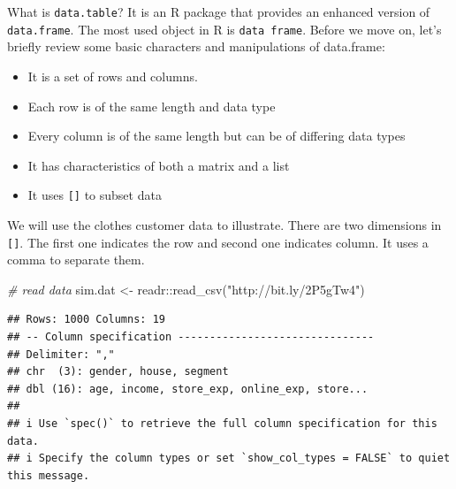 \documentclass[
  12pt,
]{krantz}
\makeatletter
\newenvironment{Shaded}{\begin{snugshade}}{\end{snugshade}}
\newcommand{\CommentTok}[1]{\textcolor[rgb]{0.37,0.37,0.37}{\textit{#1}}}
\newcommand{\DecValTok}[1]{\textcolor[rgb]{0.06,0.06,0.06}{#1}}
\newcommand{\FunctionTok}[1]{\textcolor[rgb]{0,0,0}{#1}}
\newcommand{\NormalTok}[1]{#1}
\newcommand{\OtherTok}[1]{\textcolor[rgb]{0.37,0.37,0.37}{#1}}
\newcommand{\SpecialCharTok}[1]{\textcolor[rgb]{0,0,0}{#1}}
\newcommand{\StringTok}[1]{\textcolor[rgb]{0.5,0.5,0.5}{#1}}
\providecommand{\tightlist}{%
  \setlength{\itemsep}{0pt}\setlength{\parskip}{0pt}}
\newenvironment{kframe}{%
\medskip{}
\setlength{\fboxsep}{.8em}
 \def\at@end@of@kframe{}%
 \ifinner\ifhmode%
  \def\at@end@of@kframe{\end{minipage}}%
  \begin{minipage}{\columnwidth}%
 \fi\fi%
 \def\FrameCommand##1{\hskip\@totalleftmargin \hskip-\fboxsep
 \colorbox{shadecolor}{##1}\hskip-\fboxsep
     \hskip-\linewidth \hskip-\@totalleftmargin \hskip\columnwidth}%
 \MakeFramed {\advance\hsize-\width
   \@totalleftmargin\z@ \linewidth\hsize
   \@setminipage}}%
 {\par\unskip\endMakeFramed%
 \at@end@of@kframe}
\renewenvironment{Shaded}{\begin{kframe}}{\end{kframe}}
\makeatother
\begin{document}
What is \texttt{data.table}? It is an R package that provides an enhanced version of \texttt{data.frame}. The most used object in R is \texttt{data\ frame}. Before we move on, let's briefly review some basic characters and manipulations of data.frame:

\begin{itemize}
\tightlist
\item
  It is a set of rows and columns.
\item
  Each row is of the same length and data type
\item
  Every column is of the same length but can be of differing data types
\item
  It has characteristics of both a matrix and a list
\item
  It uses \texttt{{[}{]}} to subset data
\end{itemize}

We will use the clothes customer data to illustrate. There are two dimensions in \texttt{{[}{]}}. The first one indicates the row and second one indicates column. It uses a comma to separate them.

\begin{Shaded}
\begin{Highlighting}[]
\CommentTok{\# read data}
\NormalTok{sim.dat }\OtherTok{\textless{}{-}}\NormalTok{ readr}\SpecialCharTok{::}\FunctionTok{read\_csv}\NormalTok{(}\StringTok{"http://bit.ly/2P5gTw4"}\NormalTok{)}
\end{Highlighting}
\end{Shaded}

\begin{verbatim}
## Rows: 1000 Columns: 19
## -- Column specification -------------------------------
## Delimiter: ","
## chr  (3): gender, house, segment
## dbl (16): age, income, store_exp, online_exp, store...
## 
## i Use `spec()` to retrieve the full column specification for this data.
## i Specify the column types or set `show_col_types = FALSE` to quiet this message.
\end{verbatim}

\begin{Shaded}
\end{Shaded}
\end{document}
